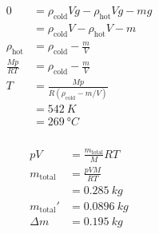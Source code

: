 \documentclass{article}
\begin{document}
\setcounter{subsubsection}{50}
\subsubsection{}

\begin{align*}
  0               & = \rho_\text{cold} V g - \rho_\text{hot} V g - m g \\
                  & = \rho_\text{cold} V - \rho_\text{hot} V - m       \\
  \rho_\text{hot} & = \rho_\text{cold} - \frac{m}{V}                   \\
  \frac{M p}{R T} & = \rho_\text{cold} - \frac{m}{V}                   \\
  T               & = \frac{M p}{R (\rho_\text{cold} - m / V)}         \\
                  & = \qty{542}{K}                                     \\
                  & = \qty{269}{\degree C}
\end{align*}

\setcounter{subsubsection}{52}
\subsubsection{}

\begin{align*}
  p V             & = \frac{m_\text{total}}{M} R T \\
  m_\text{total}  & = \frac{p V M}{R T}            \\
                  & = \qty{0.285}{kg}              \\
  m_\text{total}' & = \qty{0.0896}{kg}             \\
  \Delta m        & = \qty{0.195}{kg}
\end{align*}

\setcounter{subsubsection}{56}
\subsubsection{}
\end{document}
